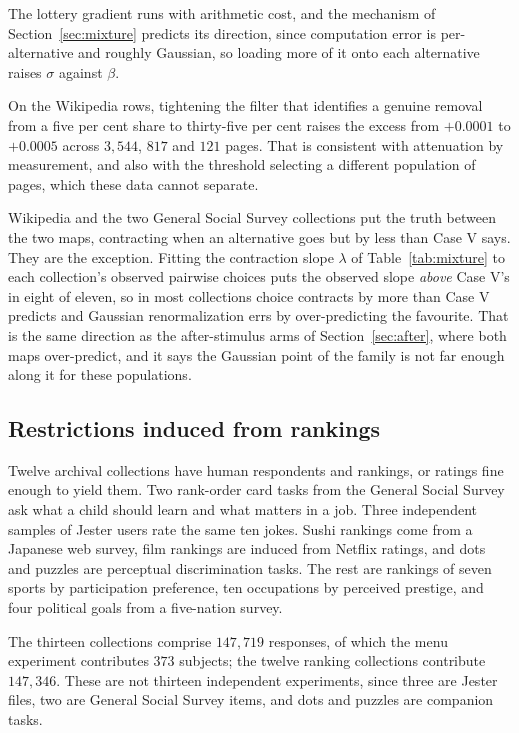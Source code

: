 \documentclass[11pt]{article}
\begin{document}
The lottery gradient runs with arithmetic cost, and the mechanism of
Section~\ref{sec:mixture} predicts its direction, since computation error is per-alternative and
roughly Gaussian, so loading more of it onto each alternative raises $\sigma$ against $\beta$.

On the Wikipedia rows, tightening the filter that identifies a genuine removal from a five per
cent share to thirty-five per cent raises the excess from $+0.0001$ to $+0.0005$ across
$3{,}544$, $817$ and $121$ pages. That is consistent with attenuation by measurement, and also
with the threshold selecting a different population of pages, which these data cannot separate.

Wikipedia and the two General Social Survey collections put the
truth between the two maps, contracting when an alternative goes but by less than Case V says.
They are the exception. Fitting the contraction slope $\lambda$ of Table~\ref{tab:mixture} to
each collection's observed pairwise choices puts the observed slope \emph{above} Case V's in
eight of eleven, so in most collections choice contracts by more than Case V predicts and
Gaussian renormalization errs by over-predicting the favourite. That is the same direction as
the after-stimulus arms of Section~\ref{sec:after}, where both maps over-predict, and it says
the Gaussian point of the family is not far enough along it for these populations.




\subsection{Restrictions induced from rankings}
\label{sec:rankings}

Twelve archival collections have human respondents and rankings, or ratings fine enough
to yield them. Two rank-order card tasks from the General Social Survey ask what a
child should learn and what matters in a job. Three independent samples of Jester users
rate the same ten jokes. Sushi rankings come from a Japanese web survey, film rankings
are induced from Netflix ratings, and dots and puzzles are perceptual discrimination
tasks. The rest are rankings of seven sports by participation preference, ten
occupations by perceived prestige, and four political goals from a five-nation survey.

The thirteen collections comprise $147{,}719$ responses, of which the menu experiment
contributes $373$ subjects; the twelve ranking collections contribute $147{,}346$.
These are not thirteen independent experiments, since three are Jester files, two are
General Social Survey items, and dots and puzzles are companion tasks.
\end{document}
